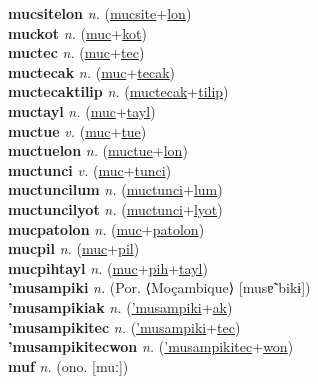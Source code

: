 \textbf{mucsitelon} \textit{n.} (\hyperref[mucsite]{mucsite}+\hyperref[lon]{lon})
 \label{mucsitelon} \\
\textbf{muckot} \textit{n.} (\hyperref[muc]{muc}+\hyperref[kot]{kot})
 \label{muckot} \\
\textbf{muctec} \textit{n.} (\hyperref[muc]{muc}+\hyperref[tec]{tec})
 \label{muctec} \\
\textbf{muctecak} \textit{n.} (\hyperref[muc]{muc}+\hyperref[tecak]{tecak})
 \label{muctecak} \\
\textbf{muctecaktilip} \textit{n.} (\hyperref[muctecak]{muctecak}+\hyperref[tilip]{tilip})
 \label{muctecaktilip} \\
\textbf{muctayl} \textit{n.} (\hyperref[muc]{muc}+\hyperref[tayl]{tayl})
 \label{muctayl} \\
\textbf{muctue} \textit{v.} (\hyperref[muc]{muc}+\hyperref[tue]{tue})
 \label{muctue} \\
\textbf{muctuelon} \textit{n.} (\hyperref[muctue]{muctue}+\hyperref[lon]{lon})
 \label{muctuelon} \\
\textbf{muctunci} \textit{v.} (\hyperref[muc]{muc}+\hyperref[tunci]{tunci})
 \label{muctunci} \\
\textbf{muctuncilum} \textit{n.} (\hyperref[muctunci]{muctunci}+\hyperref[lum]{lum})
 \label{muctuncilum} \\
\textbf{muctuncilyot} \textit{n.} (\hyperref[muctunci]{muctunci}+\hyperref[lyot]{lyot})
 \label{muctuncilyot} \\
\textbf{mucpatolon} \textit{n.} (\hyperref[muc]{muc}+\hyperref[patolon]{patolon})
 \label{mucpatolon} \\
\textbf{mucpil} \textit{n.} (\hyperref[muc]{muc}+\hyperref[pil]{pil})
 \label{mucpil} \\
\textbf{mucpihtayl} \textit{n.} (\hyperref[muc]{muc}+\hyperref[pih]{pih}+\hyperref[tayl]{tayl})
 \label{mucpihtayl} \\
\textbf{'musampiki} \textit{n.} (Por. ⟨Moçambique⟩ [musɐ̃ˈbikɨ])
 \label{'musampiki} \\
\textbf{'musampikiak} \textit{n.} (\hyperref['musampiki]{'musampiki}+\hyperref[ak]{ak})
 \label{'musampikiak} \\
\textbf{'musampikitec} \textit{n.} (\hyperref['musampiki]{'musampiki}+\hyperref[tec]{tec})
 \label{'musampikitec} \\
\textbf{'musampikitecwon} \textit{n.} (\hyperref['musampikitec]{'musampikitec}+\hyperref[won]{won})
 \label{'musampikitecwon} \\
\textbf{muf} \textit{n.} (ono. [muː])
